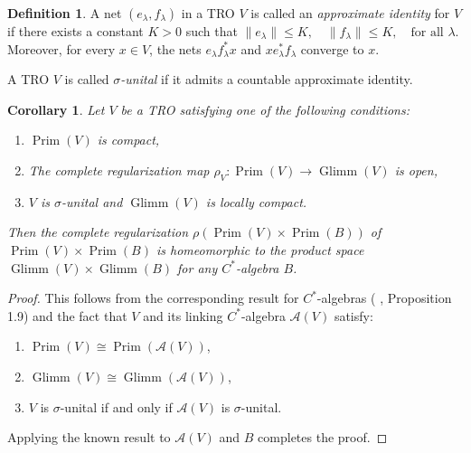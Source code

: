 \documentclass{birkjour}
\newtheorem{cor}[thm]{Corollary}
\theoremstyle{definition}
\newtheorem{defn}[thm]{Definition}
\theoremstyle{remark}
\numberwithin{equation}{section}
\begin{document}
\begin{defn}
    A net $(e_{\lambda}, f_{\lambda})$ in a TRO $V$ is called an \textit{approximate identity} for $V$ if there exists a constant $K > 0$ such that  $\| e_{\lambda} \| \leq K, \quad \| f_{\lambda} \| \leq K, \quad \text{for all } \lambda$. Moreover, for every $x \in V$, the nets  $ e_{\lambda} f_{\lambda}^{\ast} x $ and $ x e_{\lambda}^{\ast} f_{\lambda}$ converge to $x$.  

A TRO $V$ is called \textit{$\sigma$-unital} if it admits a countable approximate identity.  
\end{defn}



\begin{cor} \label{sector3main}
Let $V$ be a TRO satisfying one of the following conditions:  
\begin{enumerate}  
    \item[(i)] $\operatorname{Prim}(V)$ is compact,  
    \item[(ii)] The complete regularization map $\rho_V : \operatorname{Prim}(V) \to \operatorname{Glimm}(V)$ is open,   
    \item[(iii)] $V$ is $\sigma$-unital and $\operatorname{Glimm}(V)$ is locally compact.  
\end{enumerate}  
Then the complete regularization $\rho(\operatorname{Prim}(V) \times \operatorname{Prim}(B))$ of $\operatorname{Prim}(V) \times \operatorname{Prim}(B)$ is homeomorphic to the product space $\operatorname{Glimm}(V) \times \operatorname{Glimm}(B)$ for any $C^{\ast}$-algebra $B$.   
\end{cor}

\begin{proof}
This follows from the corresponding result for $C^*$-algebras ( \cite{Glimm}, Proposition 1.9) and the fact that $V$ and its linking  $C^*$-algebra $\mathcal{A}(V)$ satisfy:
\begin{enumerate}
    \item[(i)] $ \operatorname{Prim}(V) \cong \operatorname{Prim}(\mathcal{A}(V)) $,
    \item[(ii)] $ \operatorname{Glimm}(V) \cong \operatorname{Glimm}(\mathcal{A}(V)) $,
    \item[(iii)] $V$ is $\sigma$-unital if and only if $\mathcal{A}(V)$ is $\sigma$-unital.
\end{enumerate}
Applying the known result to $ \mathcal{A}(V) $ and $ B $ completes the proof.
\end{proof}
\end{document}
